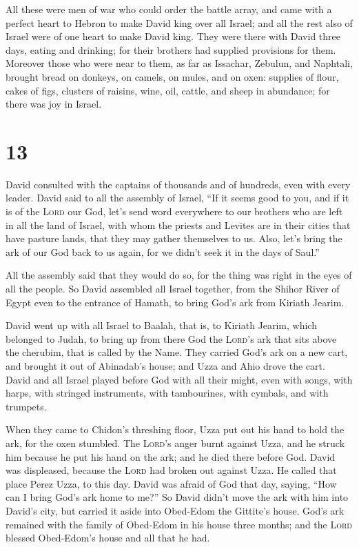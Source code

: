  All these were men of war who could order the battle
array, and came with a perfect heart to Hebron to make David king over
all Israel; and all the rest also of Israel were of one heart to make
David king.  They were there with David three days,
eating and drinking; for their brothers had supplied provisions for
them.  Moreover those who were near to them, as far as
Issachar, Zebulun, and Naphtali, brought bread on donkeys, on camels, on
mules, and on oxen: supplies of flour, cakes of figs, clusters of
raisins, wine, oil, cattle, and sheep in abundance; for there was joy in
Israel.

\hypertarget{section-12}{%
\section{13}\label{section-12}}

 David consulted with the captains of thousands and of
hundreds, even with every leader.  David said to all the
assembly of Israel, ``If it seems good to you, and if it is of the
\textsc{Lord} our God, let's send word everywhere to our brothers who
are left in all the land of Israel, with whom the priests and Levites
are in their cities that have pasture lands, that they may gather
themselves to us.  Also, let's bring the ark of our God
back to us again, for we didn't seek it in the days of Saul.''

 All the assembly said that they would do so, for the
thing was right in the eyes of all the people.  So David
assembled all Israel together, from the Shihor River of Egypt even to
the entrance of Hamath, to bring God's ark from Kiriath Jearim.

 David went up with all Israel to Baalah, that is, to
Kiriath Jearim, which belonged to Judah, to bring up from there God the
\textsc{Lord}'s ark that sits above the cherubim, that is called by the
Name.  They carried God's ark on a new cart, and brought
it out of Abinadab's house; and Uzza and Ahio drove the cart.
 David and all Israel played before God with all their
might, even with songs, with harps, with stringed instruments, with
tambourines, with cymbals, and with trumpets.

 When they came to Chidon's threshing floor, Uzza put out
his hand to hold the ark, for the oxen stumbled.  The
\textsc{Lord}'s anger burnt against Uzza, and he struck him because he
put his hand on the ark; and he died there before God. 
David was displeased, because the \textsc{Lord} had broken out against
Uzza. He called that place Perez Uzza, to this day. 
David was afraid of God that day, saying, ``How can I bring God's ark
home to me?''  So David didn't move the ark with him into
David's city, but carried it aside into Obed-Edom the Gittite's house.
 God's ark remained with the family of Obed-Edom in his
house three months; and the \textsc{Lord} blessed Obed-Edom's house and
all that he had.

